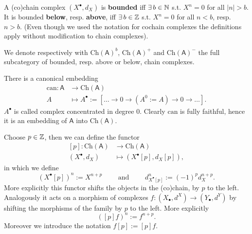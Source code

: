 \begin{defn}
	A (co)chain complex $\left(X^{\bullet}, d_X\right)$ is \textbf{bounded} iff
	$\exists\, b \in \mathbb{N}$ s.t. $X^n = 0$ for all $\left| n \right| > b$.
	It is bounded \textbf{below}, resp. \textbf{above}, iff
	$\exists\, b \in \mathbb{Z}$ s.t. $X^n = 0$ for all
	$n < b$, resp. $n > b$.
	(Even though we used the notation for cochain complexes the definitions apply without
	modification to chain complexes).

	We denote respectively with $\mathrm{Ch}(\mathsf{A})^b$, $\mathrm{Ch}(\mathsf{A})^+$
	and $\mathrm{Ch}(\mathsf{A})^-$ the full subcategory of bounded, resp. above or below, chain complexes.
\end{defn}

\begin{defn}
	There is a canonical embedding
	\begin{align}
		\mathrm{can}: \mathsf{A} &\to \mathrm{Ch}(\mathsf{A}) \\
		A &\mapsto A^{\bullet} := \left[ 
		\ldots \to 0 \to (A^0 := A) \to 0 \to \ldots \right]
	.\end{align} 
	$A^{\bullet}$ is called complex concentrated in degree $0$.
	Clearly $\mathrm{can}$ is fully faithful, hence it is an embedding of $\mathsf{A}$ into $\mathrm{Ch}(\mathsf{A})$.
\end{defn}

\begin{defn}
	Choose $p \in \mathbb{Z}$, then we can define the functor
	\begin{align}
		\left[ p \right]: \mathrm{Ch}(\mathsf{A}) &\to \mathrm{Ch}(\mathsf{A}) \\
		\left(X^{\bullet}, d_X\right) &\mapsto \left( X^{\bullet}[p], d_{X}[p] \right)
	,\end{align} 
	in which we define
	\begin{equation}
		\left( X^{\bullet} [p] \right)^n := X^{n+p} \qquad \text{ and } \qquad
		d^n_{X^{\bullet}[p]} := (-1)^{p} d_X^{n+p}
	.\end{equation} 
	More explicitly this functor shifts the objects in the (co)chain, by $p$ to the left.
	Analogously it acts on a morphism of complexes
	$f\colon \left( X_{\bullet}, d^{X} \right) \to \left( Y_{\bullet}, d^{Y} \right)$
	by shifting the morphisms of the family by $p$ to the left.
	More explicitly
	\begin{equation}
		\left( [p]f \right)^n := f^{n+p}
	.\end{equation} 
	Moreover we introduce the notation $f[p] := [p]f$.
\end{defn}


